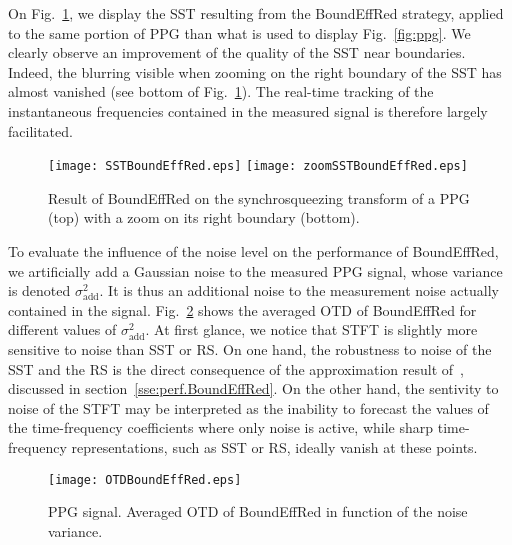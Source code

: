 On Fig.~\ref{fig:ppg.boundeffred}, we display the SST resulting from the {\sf BoundEffRed} strategy, applied to the same portion of PPG than what is used to display Fig.~\ref{fig:ppg}. We clearly observe an improvement of the quality of the SST near boundaries. Indeed, the blurring visible when zooming on the right boundary of the SST has almost vanished (see bottom of Fig.~\ref{fig:ppg.boundeffred}). The real-time tracking of the instantaneous frequencies contained in the measured signal is therefore largely facilitated.

\begin{figure}
\centering
\texttt{[image: SSTBoundEffRed.eps]}
\texttt{[image: zoomSSTBoundEffRed.eps]}
\caption{Result of {\sf BoundEffRed} on the synchrosqueezing transform of a PPG (top) with a zoom on its right boundary (bottom). }
\label{fig:ppg.boundeffred}
\end{figure}


To evaluate the influence of the noise level on the performance of {\sf BoundEffRed}, we artificially add a Gaussian noise to the measured PPG signal, whose variance is denoted $\sigma_{\mathrm{add}}^2$. It is thus an additional noise to the measurement noise actually contained in the signal. Fig.~\ref{fig:otd.noise} shows the averaged OTD of {\sf BoundEffRed} for different values of $\sigma_{\mathrm{add}}^2$. At first glance, we notice that STFT is slightly more sensitive to noise than SST or RS. On one hand, the robustness to noise of the SST and the RS is the direct consequence of the approximation result of~\cite{Daubechies16conceft}, discussed in section~\ref{sse:perf.BoundEffRed}. On the other hand, the sentivity to noise of the STFT may be interpreted as the inability to forecast the values of the time-frequency coefficients where only noise is active, while sharp time-frequency representations, such as SST or RS, ideally vanish at these points.
\begin{figure}
\centering
\texttt{[image: OTDBoundEffRed.eps]}
\caption{PPG signal. Averaged OTD of {\sf BoundEffRed} in function of the noise variance.}
\label{fig:otd.noise}
\end{figure} 